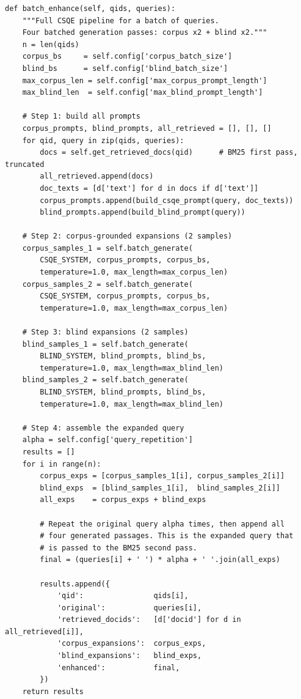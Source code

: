 \begin{codeblock}
\begin{lstlisting}[caption={CSQE batch enhancement and final query assembly.},label={lst:assembly}]
def batch_enhance(self, qids, queries):
    """Full CSQE pipeline for a batch of queries.
    Four batched generation passes: corpus x2 + blind x2."""
    n = len(qids)
    corpus_bs     = self.config['corpus_batch_size']
    blind_bs      = self.config['blind_batch_size']
    max_corpus_len = self.config['max_corpus_prompt_length']
    max_blind_len  = self.config['max_blind_prompt_length']

    # Step 1: build all prompts
    corpus_prompts, blind_prompts, all_retrieved = [], [], []
    for qid, query in zip(qids, queries):
        docs = self.get_retrieved_docs(qid)      # BM25 first pass, truncated
        all_retrieved.append(docs)
        doc_texts = [d['text'] for d in docs if d['text']]
        corpus_prompts.append(build_csqe_prompt(query, doc_texts))
        blind_prompts.append(build_blind_prompt(query))

    # Step 2: corpus-grounded expansions (2 samples)
    corpus_samples_1 = self.batch_generate(
        CSQE_SYSTEM, corpus_prompts, corpus_bs,
        temperature=1.0, max_length=max_corpus_len)
    corpus_samples_2 = self.batch_generate(
        CSQE_SYSTEM, corpus_prompts, corpus_bs,
        temperature=1.0, max_length=max_corpus_len)

    # Step 3: blind expansions (2 samples)
    blind_samples_1 = self.batch_generate(
        BLIND_SYSTEM, blind_prompts, blind_bs,
        temperature=1.0, max_length=max_blind_len)
    blind_samples_2 = self.batch_generate(
        BLIND_SYSTEM, blind_prompts, blind_bs,
        temperature=1.0, max_length=max_blind_len)

    # Step 4: assemble the expanded query
    alpha = self.config['query_repetition']
    results = []
    for i in range(n):
        corpus_exps = [corpus_samples_1[i], corpus_samples_2[i]]
        blind_exps  = [blind_samples_1[i],  blind_samples_2[i]]
        all_exps    = corpus_exps + blind_exps

        # Repeat the original query alpha times, then append all
        # four generated passages. This is the expanded query that
        # is passed to the BM25 second pass.
        final = (queries[i] + ' ') * alpha + ' '.join(all_exps)

        results.append({
            'qid':                qids[i],
            'original':           queries[i],
            'retrieved_docids':   [d['docid'] for d in all_retrieved[i]],
            'corpus_expansions':  corpus_exps,
            'blind_expansions':   blind_exps,
            'enhanced':           final,
        })
    return results
\end{lstlisting}
\end{codeblock}

